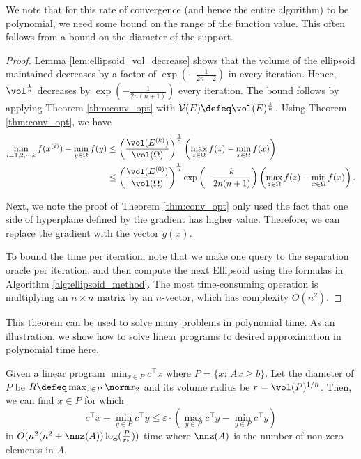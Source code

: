 \begin{rem}
We note that for this rate of convergence (and hence the entire algorithm)
to be polynomial, we need some bound on the range of the function
value. This often follows from a bound on the diameter of the support.
\end{rem}

\begin{proof}
Lemma \ref{lem:ellipsoid_vol_decrease} shows that the volume of the
ellipsoid maintained decreases by a factor of $\exp(-\frac{1}{2n+2})$
in every iteration. Hence, $\vol^{\frac{1}{n}}$ decreases by $\exp(-\frac{1}{2n(n+1)})$
every iteration. The bound follows by applying Theorem \ref{thm:conv_opt}
with $\mathcal{V}(E)\defeq\vol(E)^{\frac{1}{n}}$. Using Theorem \ref{thm:conv_opt},
we have 
\begin{align*}
\min_{i=1,2,\cdots k}f(x^{(i)})-\min_{y\in\Omega}f(y) & \le\left(\frac{\vol(E^{(k)})}{\vol(\Omega)}\right)^{\frac{1}{n}}\left(\max_{z\in\Omega}f(z)-\min_{x\in\Omega}f(x)\right)\\
 & \le\left(\frac{\vol(E^{(0)})}{\vol(\Omega)}\right)^{\frac{1}{n}}\exp\left(-\frac{k}{2n(n+1)}\right)\left(\max_{z\in\Omega}f(z)-\min_{x\in\Omega}f(x)\right).
\end{align*}

Next, we note the proof of Theorem \ref{thm:conv_opt} only used the
fact that one side of hyperplane defined by the gradient has higher
value. Therefore, we can replace the gradient with the vector $g(x)$. 

To bound the time per iteration, note that we make one query to the
separation oracle per iteration, and then compute the next Ellipsoid
using the formulas in Algorithm \ref{alg:ellipsoid_method}. The most
time-consuming operation is multiplying an $n\times n$ matrix by
an $n$-vector, which has complexity $O(n^{2})$.
\end{proof}
This theorem can be used to solve many problems in polynomial time.
As an illustration, we show how to solve linear programs to desired
approximation in polynomial time here. 
\begin{thm}
Given a linear program $\min_{x\in P}c^{\top}x$ where $P=\{x\text{: }Ax\geq b\}$.
Let the diameter of $P$ be $R\defeq\max_{x\in P}\norm x_{2}$ and
its volume radius be $r=\vol(P)^{1/n}$. Then, we can find $x\in P$
for which 
\[
c^{\top}x-\min_{y\in P}c^{\top}y\leq\varepsilon\cdot(\max_{y\in P}c^{\top}y-\min_{y\in P}c^{\top}y)
\]
in $O(n^{2}(n^{2}+\nnz(A))\log(\frac{R}{r\varepsilon}))$ time where
$\nnz(A)$ is the number of non-zero elements in $A$.
\end{thm}

